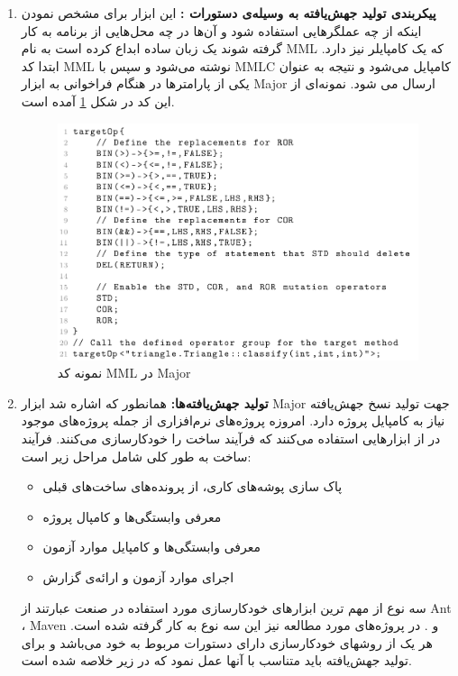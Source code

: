 \begin{enumerate}
\item

\textbf{پیکربندی تولید جهش‌یافته به وسیله‌ی دستورات : }
این ابزار برای مشخص نمودن اینکه از چه عملگرهایی استفاده شود و آن‌ها در چه محل‌هایی از برنامه به کار گرفته شوند یک زبان ساده ابداع کرده است به نام MML که یک کامپایلر نیز دارد. ابتدا کد MML نوشته می‌شود و سپس با MMLC کامپایل می‌شود و نتیجه به عنوان یکی از پارامترها  در هنگام فراخوانی به ابزار  Major ارسال می شود. نمونه‌ای از این کد در شکل \ref{fig:major-mml} آمده است. 

\begin{figure}[H]
	\centering
	\includegraphics[width=.8\textwidth]{img/case_study/major-mml.png}
	\caption{نمونه کد MML در Major}
	\label{fig:major-mml}
\end{figure}
\item 	
\textbf{تولید جهش‌یافته‌ها:}
 همانطور که اشاره شد ابزار Major جهت تولید نسخ جهش‌یافته نیاز به کامپایل پروژه دارد. امروزه پروژه‌های نرم‌افزاری از جمله پروژه‌های موجود در  از ابزارهایی استفاده می‌کنند که فرآیند ساخت را خودکارسازی می‌کنند. فرآیند ساخت به طور کلی شامل مراحل زیر است:
\begin{itemize}
	\item پاک سازی  پوشه‌های کاری، از پرونده‌های ساخت‌های قبلی
	\item 
	معرفی‌ وابستگی‌ها و کامپال پروژه
	\item
	معرفی وابستگی‌ها و کامپایل موارد آزمون
	\item
	اجرای موارد آزمون و ارائه‌ی گزارش
\end{itemize}
سه نوع از مهم ترین ابزارهای خودکارسازی مورد استفاده در صنعت عبارتند از Ant ،  Maven و . در پروژه‌های مورد مطالعه نیز این سه نوع به کار گرفته شده است.  
هر یک از روشهای خودکارسازی دارای دستورات مربوط به خود می‌باشد  و برای تولید جهش‌یافته باید متناسب با آنها عمل نمود که در زیر خلاصه شده است. 

\end{enumerate}
